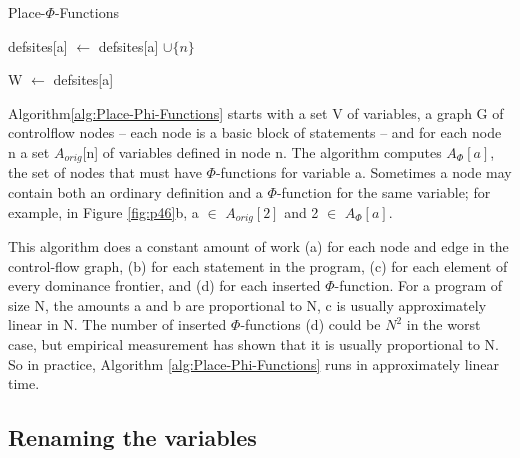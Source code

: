 \begin{algorithm}
	\caption{Place-$\Phi$-Functions}\label{alg:Place-Phi-Functions}
	\begin{algorithmic}
		\State defsites[a] $\gets$ defsites[a] $\cup \{n\}$
		\EndFor
		\EndFor


		\State W $\gets$ defsites[a]
		\EndIf

		\EndIf
		\EndFor
		\EndWhile
		\EndFor

	\end{algorithmic}
\end{algorithm}


Algorithm\ref{alg:Place-Phi-Functions} starts with a set V of variables, a graph G of controlflow nodes – each node is a basic block of statements – and for each node n a set $A_{orig}$[n] of variables defined in node n. The algorithm
computes $A_{\Phi}[a]$, the set of nodes that must have $\Phi$-functions for variable
a. Sometimes a node may contain both an ordinary definition and a
$\Phi$-function for the same variable; for example, in Figure \ref{fig:p46}b, a $\in$ $A_{orig}[2]$
and 2 $\in$ $A_{\Phi}[a]$.


This algorithm does a constant amount of work (a) for each node and edge in the control-flow graph, (b) for each statement in the program, (c) for each element of every dominance frontier, and (d) for each inserted $\Phi$-function. For a program of size N, the amounts a and b are proportional to N, c is usually approximately linear in N. The number of inserted $\Phi$-functions (d) could be $N^2$ in the worst case, but empirical measurement has shown that it is usually proportional to N. So in practice, Algorithm \ref{alg:Place-Phi-Functions} runs in approximately linear time.


\subsection{Renaming the variables}

